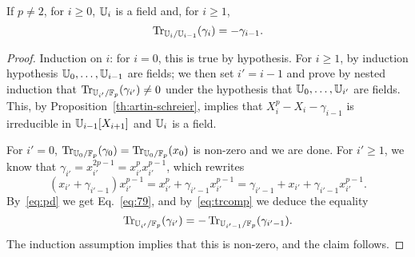 \begin{lemma}
  \label{coro:trace}
  If $p\ne2$, for $i \ge 0$, $\mathbb{U}_i$ is a field and, for $i\ge1$,
  \begin{equation}
    \label{eq:79}
    \operatorname{Tr}_{\mathbb{U}_i/\mathbb{U}_{i-1}}(\gamma_i) = -\gamma_{i-1}
    \text{.}    
  \end{equation}
\end{lemma}
\begin{proof} Induction on $i$: for $i=0$, this is true by
  hypothesis. For $i \ge 1$, by induction hypothesis
  $\mathbb{U}_0,\ldots,\mathbb{U}_{i-1}$ are fields; we then set $i'=i-1$ and prove by
  nested induction that $\operatorname{Tr}_{\mathbb{U}_{i'}/\mathbb{F}_p}(\gamma_{i'})\ne 0$ under
  the hypothesis that $\mathbb{U}_0,\ldots,\mathbb{U}_{i'}$ are fields. This, by
  Proposition~\ref{th:artin-schreier}, implies that
  $X_i^p-X_i-\gamma_{i-1}$ is irreducible in $\mathbb{U}_{i-1}[X_{i+1}]$ and
  $\mathbb{U}_i$ is a field.

  For $i'=0$, $\operatorname{Tr}_{\mathbb{U}_0/\mathbb{F}_p}(\gamma_0)=\operatorname{Tr}_{\mathbb{U}_0/\mathbb{F}_p}(x_0)$ is
  non-zero and we are done.  For $i' \ge 1$, we know that
  $\gamma_{i'}=x_{i'}^{2p-1}=x_{i'}^px_{i'}^{p-1}$, which rewrites
  \begin{equation}
    (x_{i'}+\gamma_{i'-1})x_{i'}^{p-1} = x_{i'}^p +\gamma_{i'-1} x_{i'}^{p-1}
    = \gamma_{i'-1} + x_{i'} +\gamma_{i'-1} x_{i'}^{p-1}.
  \end{equation}
  By~\ref{eq:pd} we get Eq.~\eqref{eq:79}, and by~\ref{eq:trcomp} we
  deduce the equality
  \begin{equation}
    \label{eq:64}
    \operatorname{Tr}_{\mathbb{U}_{i'}/\mathbb{F}_p}(\gamma_{i'})=-\operatorname{Tr}_{\mathbb{U}_{i'-1}/\mathbb{F}_p}(\gamma_{i'-1})\text{.}    
  \end{equation}
  The induction assumption implies that this is non-zero, and the
  claim follows.
\end{proof}

